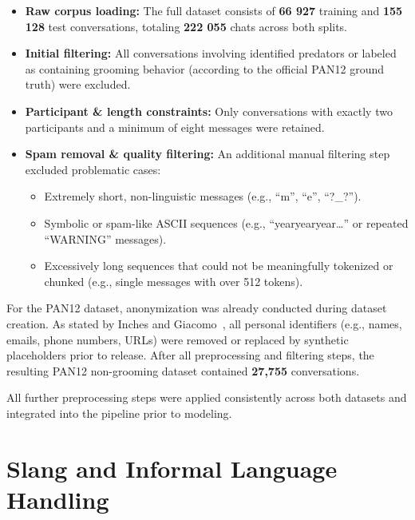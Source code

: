 \begin{itemize}
    \item \textbf{Raw corpus loading:} The full dataset consists of \textbf{66 927} training and \textbf{155 128} test conversations, totaling \textbf{222 055} chats across both splits.
    \item \textbf{Initial filtering:} All conversations involving identified predators or labeled as containing grooming behavior (according to the official PAN12 ground truth) were excluded.
    \item \textbf{Participant \& length constraints:} Only conversations with exactly two participants and a minimum of eight messages were retained. 
    \item \textbf{Spam removal \& quality filtering:} An additional manual filtering step excluded problematic cases:
    \begin{itemize}
        \item Extremely short, non-linguistic messages (e.g., \enquote{m}, \enquote{e}, \enquote{?\_?}).
        \item Symbolic or spam-like ASCII sequences (e.g., \enquote{yearyearyear\ldots} or repeated \enquote{WARNING} messages).
        \item Excessively long sequences that could not be meaningfully tokenized or chunked (e.g., single messages with over 512 tokens).
    \end{itemize}
\end{itemize}

For the PAN12 dataset, anonymization was already conducted during dataset creation. As stated by Inches and Giacomo~\cite{inches2012pan}, all personal identifiers (e.g., names, emails, phone numbers, URLs) were removed or replaced by synthetic placeholders prior to release. After all preprocessing and filtering steps, the resulting PAN12 non-grooming dataset contained \textbf{27,755} conversations.

All further preprocessing steps were applied consistently across both datasets and integrated into the pipeline prior to modeling.

\section{Slang and Informal Language Handling}

